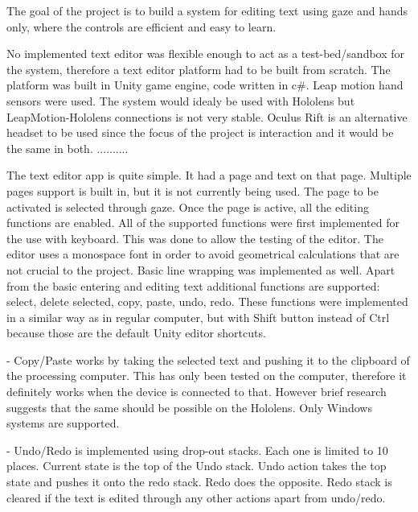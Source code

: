 \documentclass[a4paper, 12pt]{article}
\begin{document}
The goal of the project is to build a system for editing text using gaze and hands only, where the controls are efficient and easy to learn. 



No implemented text editor was flexible enough to act as a test-bed/sandbox for the system, therefore a text editor platform had to be built from scratch. The platform was built in Unity game engine, code written in c\#. Leap motion hand sensors were used. The system would idealy be used with Hololens but LeapMotion-Hololens connections is not very stable. Oculus Rift is an alternative headset to be used since the focus of the project is interaction and it would be the same in both. ..........



The text editor app is quite simple. It had a page and text on that page. Multiple pages support is built in, but it is not currently being used. The page to be activated is selected through gaze. Once the page is active, all the editing functions are enabled. All of the supported functions were first implemented for the use with keyboard. This was done to allow the testing of the editor. The editor uses a monospace font in order to avoid geometrical calculations that are not crucial to the project. Basic line wrapping was implemented as well. Apart from the basic entering and editing text additional functions are supported: select, delete selected, copy, paste, undo, redo. These functions were implemented in a similar way as in regular computer, but with Shift button instead of Ctrl because those are the default Unity editor shortcuts.

- Copy/Paste works by taking the selected text and pushing it to the clipboard of the processing computer. This has only been tested on the computer, therefore it definitely works when the device is connected to that. However brief research suggests that the same should be possible on the Hololens. Only Windows systems are supported.

- Undo/Redo is implemented using drop-out stacks. Each one is limited to 10 places. Current state is the top of the Undo stack. Undo action takes the top state and pushes it onto the redo stack. Redo does the opposite. Redo stack is cleared if the text is edited through any other actions apart from undo/redo.
\end{document}
